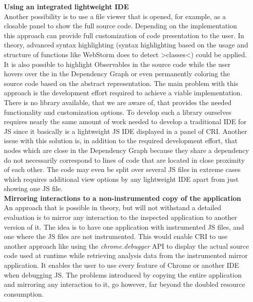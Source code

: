 \textbf{Using an integrated lightweight IDE}\\
Another possibility is to use a file viewer that is opened, for example, as a closable panel to show the full source code. Depending on the implementation this approach can provide full customization of code presentation to the user. In theory, advanced syntax highlighting (syntax highlighting based on the usage and structure of functions like WebStorm does to detect >classes<) could be applied. It is also possible to highlight Observables in the source code while the user hovers over the in the Dependency Graph or even permanently coloring the source code based on the abstract representation. The main problem with this approach is the development effort required to achieve a viable implementation. There is no library available, that we are aware of, that provides the needed functionality and customization options. To develop such a library ourselves requires nearly the same amount of work needed to develop a traditional IDE for JS since it basically is a lightweight JS IDE displayed in a panel of CRI. Another issue with this solution is, in addition to the required development effort, that nodes which are close in the Dependency Graph because they share a dependency do not necessarily correspond to lines of code that are located in close proximity of each other. The code may even be split over several JS files in extreme cases which requires additional view options by any lightweight IDE apart from just showing one JS file.\\ %
\textbf{Mirroring interactions to a non-instrumented copy of the application}\\
An approach that is possible in theory, but will not withstand a detailed evaluation is to mirror any interaction to the inspected application to another version of it. The idea is to have one application with instrumented JS files, and one where the JS files are not instrumented. This would enable CRI to use another approach like using the \emph{chrome.debugger} API to display the actual source code used at runtime while retrieving analysis data from the instrumented mirror application. It enables the user to use every feature of Chrome or another IDE when debugging JS. The problems introduced by copying the entire application and mirroring any interaction to it, go however, far beyond the doubled resource consumption. %
